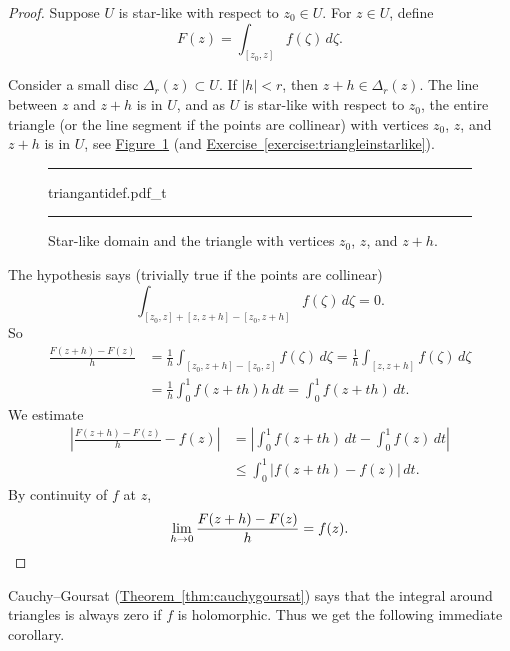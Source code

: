 \documentclass[12pt,openany]{book}
\newcommand{\sabs}[1]{\lvert {#1} \rvert}
\newcommand{\abs}[1]{\left\lvert {#1} \right\rvert}
\theoremstyle{plain}
\theoremstyle{remark}
\theoremstyle{definition}
\newenvironment{myfig}{%
\begin{figure}[h!t]
\noindent\rule{\textwidth}{0.5pt}\vspace{12pt}\par\centering}%
{\par\noindent\rule{\textwidth}{0.5pt}
\end{figure}}
\theoremstyle{exercise}
\theoremstyle{example}
\newcommand{\figureref}[1]{\hyperref[#1]{Figure~\ref*{#1}}}
\newcommand{\exerciseref}[1]{\hyperref[#1]{Exercise~\ref*{#1}}}
\newcommand{\thmref}[1]{\hyperref[#1]{Theorem~\ref*{#1}}}
\begin{document}
\begin{proof}
Suppose $U$ is star-like with respect to $z_0 \in U$.
For $z \in U$, define
\begin{equation*}
F(z) = \int_{[z_0,z]} f(\zeta) \, d\zeta .
\end{equation*}

Consider a small disc $\Delta_r(z) \subset U$.
If $\sabs{h} < r$, then
$z+h \in \Delta_r(z)$.
The line between $z$ and $z+h$ is in $U$, and
as $U$ is star-like with respect to $z_0$, 
the entire triangle (or the line segment if the points are collinear)
with vertices $z_0$, $z$, and $z+h$
is in $U$, see \figureref{fig:triangantidef}
(and \exerciseref{exercise:triangleinstarlike}).
\begin{myfig}
{triangantidef.pdf_t}
\caption{Star-like domain and the triangle with vertices
$z_0$, $z$, and $z+h$.\label{fig:triangantidef}}
\end{myfig}

The hypothesis says (trivially true if the points are collinear)
\begin{equation*}
\int_{[z_0,z]+[z,z+h]-[z_0,z+h]} f(\zeta) \, d\zeta = 0 .
\end{equation*}
So
\begin{equation*}
\begin{split}
\frac{F(z+h)-F(z)}{h} &=
\frac{1}{h}
\int_{[z_0,z+h]-[z_0,z]} f(\zeta) \, d\zeta
=
\frac{1}{h}
\int_{[z,z+h]} f(\zeta) \, d\zeta
\\
& =
\frac{1}{h}
\int_0^1 f(z+th) h \, dt
=
\int_0^1 f(z+th) \, dt .
\end{split}
\end{equation*}
We estimate
\begin{equation*}
\begin{split}
\abs{
\frac{F(z+h)-F(z)}{h} 
-
f(z)
}
& =
\abs{
\int_0^1 f(z+th) \, dt
-
\int_0^1 f(z) \, dt
}
\\
& \leq
\int_0^1 \abs{f(z+th)-f(z)} \, dt .
\end{split}
\end{equation*}
By continuity of $f$ at $z$,
\begin{equation*}
\lim_{h \to 0}
\frac{F(z+h)-F(z)}{h} 
=
f(z) . \qedhere
\end{equation*}
\end{proof}

Cauchy--Goursat (\thmref{thm:cauchygoursat}) says that the integral around
triangles is always zero if $f$ is holomorphic.  Thus we get
the following immediate corollary.
\end{document}
